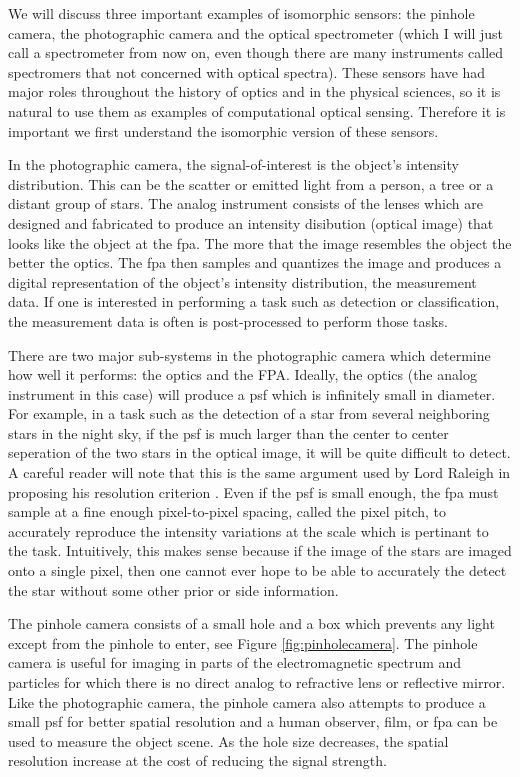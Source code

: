 We will discuss three important examples of isomorphic sensors: the pinhole camera, the photographic camera and the optical spectrometer (which I will just call a spectrometer from now on, even though there are many instruments called spectromers that not concerned with optical spectra). These sensors have had major roles throughout the history of optics and in the physical sciences, so it is natural to use them as examples of computational optical sensing. Therefore it is important we first understand the isomorphic version of these sensors.

In the photographic camera, the signal-of-interest is the object's intensity distribution. This can be the scatter or emitted light from a person, a tree or a distant group of stars. The analog instrument consists of the lenses which are designed and fabricated to produce an intensity disibution (optical image) that looks like the object at the \gls{fpa}. The more that the image resembles the object the better the optics. The \gls{fpa} then samples and quantizes the image and produces a digital representation of the object's intensity distribution, the measurement data. If one is interested in performing a task such as detection or classification, the measurement data is often is post-processed to perform those tasks. 


There are two major sub-systems in the photographic camera which determine how well it performs: the optics and the FPA. Ideally, the optics (the analog instrument in this case) will produce a \gls{psf} which is infinitely small in diameter. For example, in a task such as the detection of a star from several neighboring stars in the night sky, if the \gls{psf} is much larger than the center to center seperation of the two stars in the optical image, it will be quite difficult to detect. A careful reader will note that this is the same argument used by Lord Raleigh in proposing his resolution criterion \cite{rayleigh1879investigations}. Even if the \gls{psf} is small enough, the \gls{fpa} must sample at a fine enough pixel-to-pixel spacing, called the \gls{pixel pitch}, to accurately reproduce the intensity variations at the scale which is pertinant to the task. Intuitively, this makes sense because if the image of the stars are imaged onto a single pixel, then one cannot ever hope to be able to accurately the detect the star without some other prior or side information. 

The pinhole camera consists of a small hole and a box which prevents any light except from the pinhole to enter, see Figure \ref{fig:pinholecamera}. The pinhole camera is useful for imaging in parts of the electromagnetic spectrum and particles for which there is no direct analog to refractive lens or reflective mirror. Like the photographic camera, the pinhole camera also attempts to produce a small \gls{psf} for better spatial resolution and a human observer, film, or \gls{fpa} can be used to measure the object scene. As the hole size decreases, the spatial resolution increase at the cost of reducing the signal strength.

